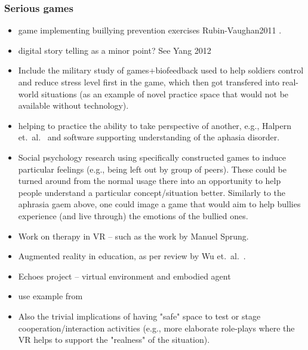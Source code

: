 \documentclass[prodmode,acmtochi]{acmsmall}
\newcommand{\todo}[1]{\textrm{\textrm{\textcolor{LightBlue}{[[#1]]} } } }
\begin{document}
\subsubsection{Serious games}
\begin{itemize}
                        \item game implementing buillying prevention exercises Rubin-Vaughan2011 \cite{Rubin-Vaughan2011}. 
                \item digital story telling as a minor point? See Yang 2012 \cite{Yang2012}
                        \item Include the military study of games+biofeedback used to help soldiers control and reduce stress level first in the game, which then got transfered into real-world situations \cite{Bouchard2012} (as an example of novel practice space that would not be available without technology). 
                        \item helping to practice the ability to take perspective of another, e.g., Halpern et.~al.~ \cite{Hailpern2011} and software supporting understanding of the aphasia disorder.
                        \item Social psychology research using specifically constructed games to induce particular feelings (e.g., being left out by group of peers). These could be turned around from the normal usage there into an opportunity to help people understand a particular concept/situation better. Similarly to the aphrasia gaem above, one could image a game that would aim to help bullies experience (and live through) the emotions of the bullied ones. 
 
\end{itemize}

\begin{itemize}
                        \item Work on therapy in VR -- such as the work by Manuel Sprung. 

                        \item Augmented reality in education, as per review by Wu et.~al.~\cite{Wu2012}.
                        \item Echoes project \cite{Porayska-Pomsta2011} -- virtual environment and embodied agent
                        \item use example from \cite{Core2006}
                        \item Also the trivial implications of having "safe" space to test or stage cooperation/interaction activities (e.g., more elaborate role-plays where the VR helps to support the "realness" of the situation). 
\end{itemize}
\fi
\end{document}
